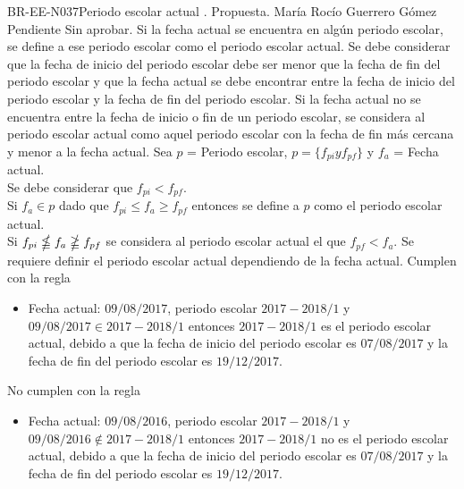 \begin{BusinessRule}{BR-EE-N037}{Periodo escolar actual}
	{\bcIntegridad}    %
	{\btEnabler}     %
	{\blControlling}    %
	.
	\BRItem[Estado] Propuesta.
	 María Rocío Guerrero Gómez
	 Pendiente
	 Sin aprobar.
	\BRItem[Descripción] Si la fecha actual se encuentra en algún periodo escolar, se define a ese periodo escolar como el periodo escolar actual. Se debe considerar que la fecha de inicio del periodo escolar debe ser menor que la fecha de fin del periodo escolar y que la fecha actual se debe encontrar entre la fecha de inicio del periodo escolar y la fecha de fin del periodo escolar. Si la fecha actual no se encuentra entre la fecha de inicio o fin de un periodo escolar, se considera al periodo escolar actual como aquel periodo escolar con la fecha de fin más cercana y menor a la fecha actual.
	\BRItem[Sentencia]  Sea $p$ = Periodo escolar, $p = \{f_{pi} y f_{pf}\}$ y $f_a$ = Fecha actual.\\
	Se debe considerar que $f_{pi}  < f_{pf}$.\\
	Si $f_a \in p$ dado que $f_{pi} \leq f_{a} \geq f_{pf}$ entonces se define a $p$ como el periodo escolar actual.\\
	Si $f_{pi} \nleqq f_{a} \ngeqq f_{pf}$ se considera al periodo escolar actual el que $f_{pf} < f_{a}$.
	\BRItem[Motivación] Se requiere definir el periodo escolar actual dependiendo de la fecha actual.
	 Cumplen con la regla
	\begin{itemize}
		\item Fecha actual: $09/08/2017$, periodo escolar $2017-2018/1$ y $09/08/2017 \in 2017-2018/1$ entonces $2017-2018/1$ es el periodo escolar actual, debido a que la fecha de inicio del periodo escolar es $07/08/2017$ y la fecha de fin del periodo escolar es $19/12/2017$.
	\end{itemize}
	 No cumplen con la regla
	\begin{itemize}
	\item Fecha actual: $09/08/2016$, periodo escolar $2017-2018/1$ y $09/08/2016 \not \in 2017-2018/1$ entonces $2017-2018/1$ no es el periodo escolar actual, debido a que la fecha de inicio del periodo escolar es $07/08/2017$ y la fecha de fin del periodo escolar es $19/12/2017$.
	\end{itemize}
\end{BusinessRule}

